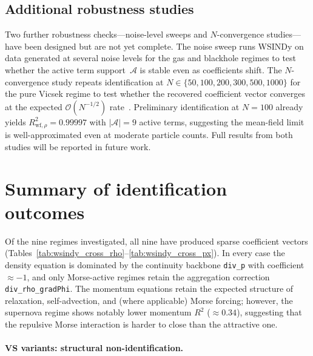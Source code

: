 \subsection{Additional robustness studies}
\label{sec:wsindy_noise}

Two further robustness checks---noise-level sweeps and $N$-convergence
studies---have been designed but are not yet complete.  The noise sweep
runs WSINDy on data generated at several noise levels for the gas and
blackhole regimes to test whether the active term support~$\mathcal{A}$
is stable even as coefficients shift.  The $N$-convergence study repeats
identification at $N\in\{50, 100, 200, 300, 500, 1000\}$ for the pure
Vicsek regime to test whether the recovered coefficient vector converges
at the expected $\mathcal{O}(N^{-1/2})$
rate~\cite{messenger2021wsindy}.
\label{sec:wsindy_n_convergence}
Preliminary identification at $N{=}100$ already yields
$R^2_{\text{wf},\rho}=0.99997$ with $|\mathcal{A}|{=}9$ active terms,
suggesting the mean-field limit is well-approximated even at moderate
particle counts.  Full results from both studies will be reported in
future work.

\section{Summary of identification outcomes}
\label{sec:wsindy_outcomes}

Of the nine regimes investigated, all nine have produced sparse coefficient
vectors (Tables~\ref{tab:wsindy_cross_rho}--\ref{tab:wsindy_cross_px}).
In every case the density equation is dominated by the continuity backbone
\texttt{div\_p} with coefficient~$\approx -1$, and only Morse-active
regimes retain the aggregation correction \texttt{div\_rho\_gradPhi}.  The
momentum equations retain the expected structure of relaxation,
self-advection, and (where applicable) Morse forcing; however, the
supernova regime shows notably lower momentum $R^2$ ($\approx 0.34$),
suggesting that the repulsive Morse interaction is harder to close than
the attractive one.

\paragraph{VS variants: structural non-identification.}
\label{subsec:outcomes_vs}

